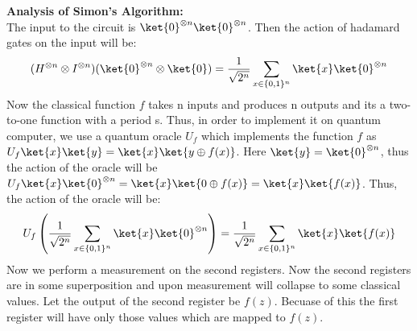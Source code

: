 \documentclass[12pt, oneside]{book}
\theoremstyle{definition}
\theoremstyle{definition}
\theoremstyle{remark}
\begin{document}
\textbf{Analysis of Simon's Algorithm: }\\
The input to the circuit is $\ket{0}^{\otimes n}\ket{0}^{\otimes n}$. 
Then the action of hadamard gates on the input will be:
\[
(H^{\otimes n} \otimes I^{\otimes n})(\ket{0}^{\otimes n} \otimes \ket{0})=\frac{1}{\sqrt{2^n}}\sum_{x \in \{0,1\}^n}\ket{x}\ket{0}^{\otimes n}
\]
Now the classical function $f$ takes n inputs and produces n outputs and its a two-to-one function with a period s. Thus, in order to implement it on quantum computer, 
we use a quantum oracle $U_f$ which implements the function $f$ as $U_f\ket{x}\ket{y}=\ket{x}\ket{y\oplus f(x)}$.
Here $\ket{y}=\ket{0}^{\otimes n}$, thus the action of the oracle will be $U_f\ket{x}\ket{0}^{\otimes n}=\ket{x}\ket{0 \oplus f(x)}=\ket{x}\ket{f(x)}$.
Thus, the action of the oracle will be:
\[
    U_f\left(\frac{1}{\sqrt{2^n}}\sum_{x \in \{0,1\}^n}\ket{x}\ket{0}^{\otimes n}\right)=\frac{1}{\sqrt{2^n}}\sum_{x \in \{0,1\}^n}\ket{x}\ket{f(x)}
\]
Now  we perform a measurement on the second registers. Now the second registers are in some superposition and upon measurement will 
collapse to some classical values. Let the output of the second register be $f(z)$. Becuase of this the first register will have only those values which are mapped to $f(z)$.
\end{document}
